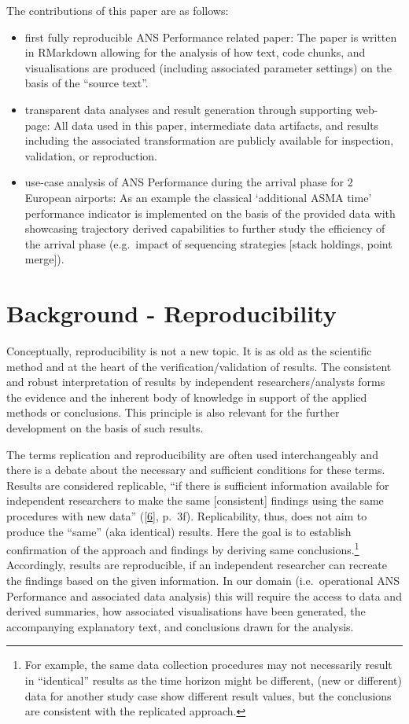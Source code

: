 \documentclass[conference,final,a4paper,]{IEEEtran}
\providecommand{\tightlist}{%
  \setlength{\itemsep}{0pt}\setlength{\parskip}{0pt}}
\begin{document}
The contributions of this paper are as follows:

\begin{itemize}
\tightlist
\item
  first fully reproducible ANS Performance related paper: The paper is
  written in RMarkdown allowing for the analysis of how text, code
  chunks, and visualisations are produced (including associated
  parameter settings) on the basis of the ``source text''.
\item
  transparent data analyses and result generation through supporting
  web-page: All data used in this paper, intermediate data artifacts,
  and results including the associated transformation are publicly
  available for inspection, validation, or reproduction.
\item
  use-case analysis of ANS Performance during the arrival phase for 2
  European airports: As an example the classical `additional ASMA time'
  performance indicator is implemented on the basis of the provided data
  with showcasing trajectory derived capabilities to further study the
  efficiency of the arrival phase (e.g.~impact of sequencing strategies
  {[}stack holdings, point merge{]}).
\end{itemize}

\section{Background -
Reproducibility}\label{background---reproducibility}

Conceptually, reproducibility is not a new topic. It is as old as the
scientific method and at the heart of the verification/validation of
results. The consistent and robust interpretation of results by
independent researchers/analysts forms the evidence and the inherent
body of knowledge in support of the applied methods or conclusions. This
principle is also relevant for the further development on the basis of
such results.

The terms replication and reproducibility are often used interchangeably
and there is a debate about the necessary and sufficient conditions for
these terms. Results are considered replicable, ``if there is sufficient
information available for independent researchers to make the same
{[}consistent{]} findings using the same procedures with new data''
({[}\protect\hyperlink{ref-gandrud_2015}{6}{]}, p.~3f). Replicability,
thus, does not aim to produce the ``same'' (aka identical) results. Here
the goal is to establish confirmation of the approach and findings by
deriving same conclusions.\footnote{For example, the same data
  collection procedures may not necessarily result in ``identical''
  results as the time horizon might be different, (new or different)
  data for another study case show different result values, but the
  conclusions are consistent with the replicated approach.} Accordingly,
results are reproducible, if an independent researcher can recreate the
findings based on the given information. In our domain (i.e.~operational
ANS Performance and associated data analysis) this will require the
access to data and derived summaries, how associated visualisations have
been generated, the accompanying explanatory text, and conclusions drawn
for the analysis.
\end{document}
